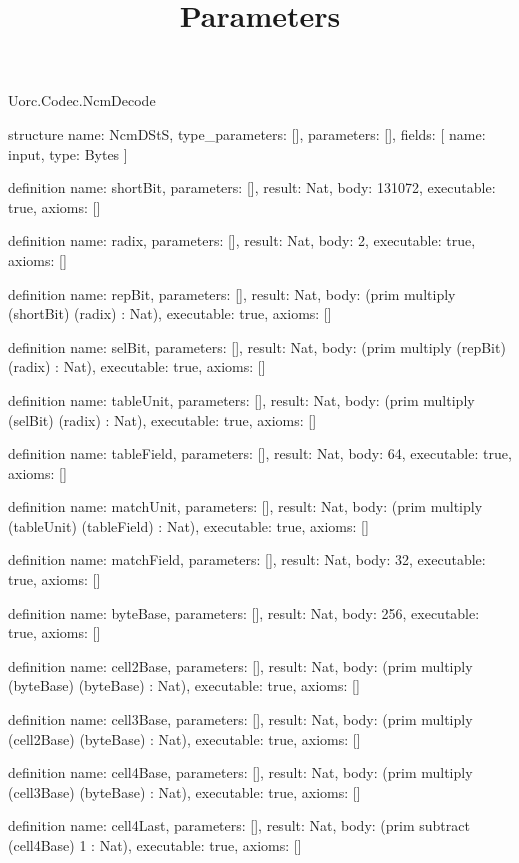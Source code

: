 \begin{lexlean}{Uorc.Codec.NcmDecode}
\title{Parameters}
\begin{semanticmodule}
structure{
  name: NcmDStS,
  type_parameters: [],
  parameters: [],
  fields: [
    {name: input, type: Bytes}
  ]
}

definition{
  name: shortBit,
  parameters: [],
  result: Nat,
  body: 131072,
  executable: true,
  axioms: []
}

definition{
  name: radix,
  parameters: [],
  result: Nat,
  body: 2,
  executable: true,
  axioms: []
}

definition{
  name: repBit,
  parameters: [],
  result: Nat,
  body: (prim multiply (shortBit) (radix) : Nat),
  executable: true,
  axioms: []
}

definition{
  name: selBit,
  parameters: [],
  result: Nat,
  body: (prim multiply (repBit) (radix) : Nat),
  executable: true,
  axioms: []
}

definition{
  name: tableUnit,
  parameters: [],
  result: Nat,
  body: (prim multiply (selBit) (radix) : Nat),
  executable: true,
  axioms: []
}

definition{
  name: tableField,
  parameters: [],
  result: Nat,
  body: 64,
  executable: true,
  axioms: []
}

definition{
  name: matchUnit,
  parameters: [],
  result: Nat,
  body: (prim multiply (tableUnit) (tableField) : Nat),
  executable: true,
  axioms: []
}

definition{
  name: matchField,
  parameters: [],
  result: Nat,
  body: 32,
  executable: true,
  axioms: []
}

definition{
  name: byteBase,
  parameters: [],
  result: Nat,
  body: 256,
  executable: true,
  axioms: []
}

definition{
  name: cell2Base,
  parameters: [],
  result: Nat,
  body: (prim multiply (byteBase) (byteBase) : Nat),
  executable: true,
  axioms: []
}

definition{
  name: cell3Base,
  parameters: [],
  result: Nat,
  body: (prim multiply (cell2Base) (byteBase) : Nat),
  executable: true,
  axioms: []
}

definition{
  name: cell4Base,
  parameters: [],
  result: Nat,
  body: (prim multiply (cell3Base) (byteBase) : Nat),
  executable: true,
  axioms: []
}

definition{
  name: cell4Last,
  parameters: [],
  result: Nat,
  body: (prim subtract (cell4Base) 1 : Nat),
  executable: true,
  axioms: []
}


\end{semanticmodule}
\end{lexlean}
